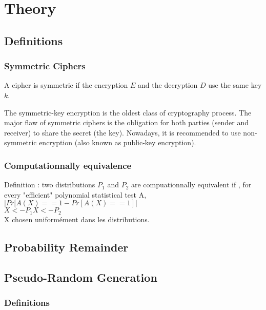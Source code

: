 \chapter{Theory}

\section{Definitions}

\subsection{Symmetric Ciphers}

\begin{mydef}
\begin{minipage}[t]{0.8\textwidth}
    A cipher is symmetric if the encryption $E$ and the decryption $D$ use the same key $k$.
\end{minipage}
\end{mydef}

The symmetric-key encryption is the oldest class of cryptography process. The major flaw of symmetric ciphers is the obligation for both parties (sender and receiver) to share the secret (the key). Nowadays, it is recommended to use non-symmetric encryption (also known as public-key encryption).

\subsection{Computationnally equivalence}
Definition : two distributions $P_1$ and $P_2$ are compuationnally equivalent if , for every "efficient" polynomial statistical test A, \\

$ | Pr[A(X) == 1  - Pr[A(X) == 1] |  $ \\
$   X <- P_1      X <- P_2              $ \\
X chosen uniformément dans les distributions.

\section{Probability Remainder}

\section{ Pseudo-Random Generation }

\subsection{ Definitions }
